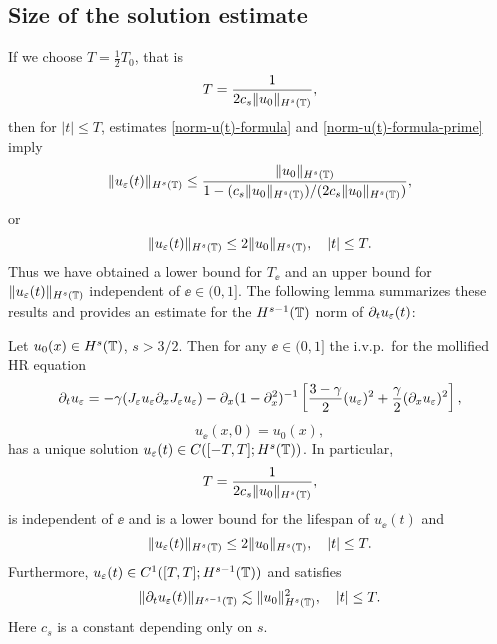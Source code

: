 \subsection{Size of the solution estimate} If we choose  $T=\frac12 T_0$, that is
%
\begin{equation} 
\label{T-def}
T
=
\frac{1}{2 c_s \|u_0\|_{H^s(\mathbb{T})}},
\end{equation}
%
then for $|t| \le T$, estimates \eqref{norm-u(t)-formula} and
\eqref{norm-u(t)-formula-prime} imply 
%
\begin{equation*} 
\label{u(t)-u(0)-bound}
\|u_\varepsilon(t)\|_{H^s(\mathbb{T})}
\le
\frac{\|u_0\|_{H^s(\mathbb{T})}}{1-(c_s\|u_0\|_{H^s(\mathbb{T})})/(2 c_s \|u_0\|_{H^s(\mathbb{T})})},
\end{equation*}
%
or 
%
\begin{equation} 
\|u_\varepsilon(t)\|_{H^s(\mathbb{T})}
\le
2 \|u_0\|_{H^s(\mathbb{T})},
\quad 
|t| \le T.
\end{equation}
%
Thus we have obtained a lower bound for $T_\ee$ and an upper bound for
$\|u_\varepsilon(t)\|_{H^s(\mathbb{T})}$ independent of $\ee\in (0, 1]$. The following
lemma summarizes these results and provides an estimate for the
$H^{s-1}(\mathbb{T})$ norm of $\partial_t u_\varepsilon(t)$:
%
%
\begin{lemma}
\label{hr_wp}
Let  $u_0(x) \in  H^s(\mathbb{T})$, $s >3/2$. Then for any $\ee\in (0, 1]$
the i.v.p.\ for the mollified HR equation 
%
\begin{equation} 
\label{hr-moli-2}
\partial_t  u_\varepsilon 
=
-\gamma (J_\varepsilon u_\varepsilon \partial_x  J_\varepsilon  u_\varepsilon) - \partial_x (1-\partial_x^2)^{-1} \left
[\frac{3-\gamma}{2}(u_\varepsilon)^2 + \frac{\gamma}{2}(\partial_x u_\varepsilon)^2
\right ], 
\end{equation} 
%
\begin{equation} 
\label{burgers-moli-data-2} 
u_\ee(x, 0) = u_0 (x),
\end{equation}
%
has a unique solution $u_\varepsilon( t)\in C([-T, T]; H^s(\mathbb{T}))$. 
In particular,
%
\begin{equation} 
\label{life-est}
T
=
\frac{1}{2 c_s \|u_0\|_{H^s(\mathbb{T})}},
\end{equation}
%
is independent of $\ee$ and
is a lower bound for the lifespan of $u_\ee( t)$ and
%
\begin{equation}
\label{u-e-Hs-bound}
\|u_\varepsilon(t)\|_{H^s(\mathbb{T})}
\le
2 \|u_0 \|_{H^s(\mathbb{T})},
\quad
|t| \le T.
\end{equation}
%
Furthermore,  $u_\varepsilon( t)\in C^1([T, T]; H^{s-1}(\mathbb{T}))$ and 
satisfies
\begin{equation}
\label{dt-u-e-Hs-bound}
\|\partial_t u_\varepsilon(t)\|_{H^{s-1}(\mathbb{T})}
\lesssim
\|u_0 \|_{H^s(\mathbb{T})}^2,
\quad
|t| \le T.
\end{equation}
% 
Here  $c_s$ is a constant depending only on $s$.
\end{lemma}
%
%
